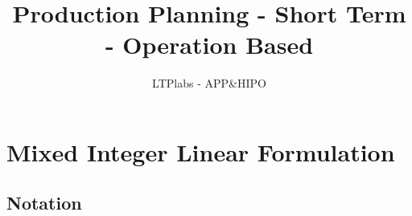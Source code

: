 \documentclass{article}
\title{Production Planning - Short Term - Operation Based}
\author{LTPlabs - APP\&HIPO}
\date{}
\begin{document}
\maketitle

\section{Mixed Integer Linear Formulation}

\subsection{Notation}

\begingroup
\small
\setlength{\LTleft}{0pt}
\setlength{\LTright}{0pt}
\setlength{\tabcolsep}{4pt}
\renewcommand{\arraystretch}{1.15}
\end{document}
